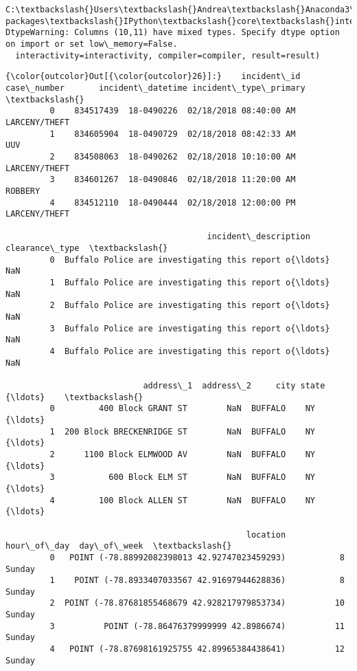 \documentclass[11pt]{article}
\begin{document}
    \begin{Verbatim}[commandchars=\\\{\}]
C:\textbackslash{}Users\textbackslash{}Andrea\textbackslash{}Anaconda3\textbackslash{}lib\textbackslash{}site-packages\textbackslash{}IPython\textbackslash{}core\textbackslash{}interactiveshell.py:2785: DtypeWarning: Columns (10,11) have mixed types. Specify dtype option on import or set low\_memory=False.
  interactivity=interactivity, compiler=compiler, result=result)

    \end{Verbatim}

\begin{Verbatim}[commandchars=\\\{\}]
{\color{outcolor}Out[{\color{outcolor}26}]:}    incident\_id case\_number       incident\_datetime incident\_type\_primary  \textbackslash{}
         0    834517439  18-0490226  02/18/2018 08:40:00 AM         LARCENY/THEFT   
         1    834605904  18-0490729  02/18/2018 08:42:33 AM                   UUV   
         2    834508063  18-0490262  02/18/2018 10:10:00 AM         LARCENY/THEFT   
         3    834601267  18-0490846  02/18/2018 11:20:00 AM               ROBBERY   
         4    834512110  18-0490444  02/18/2018 12:00:00 PM         LARCENY/THEFT   
         
                                         incident\_description  clearance\_type  \textbackslash{}
         0  Buffalo Police are investigating this report o{\ldots}             NaN   
         1  Buffalo Police are investigating this report o{\ldots}             NaN   
         2  Buffalo Police are investigating this report o{\ldots}             NaN   
         3  Buffalo Police are investigating this report o{\ldots}             NaN   
         4  Buffalo Police are investigating this report o{\ldots}             NaN   
         
                            address\_1  address\_2     city state   {\ldots}    \textbackslash{}
         0         400 Block GRANT ST        NaN  BUFFALO    NY   {\ldots}     
         1  200 Block BRECKENRIDGE ST        NaN  BUFFALO    NY   {\ldots}     
         2      1100 Block ELMWOOD AV        NaN  BUFFALO    NY   {\ldots}     
         3           600 Block ELM ST        NaN  BUFFALO    NY   {\ldots}     
         4         100 Block ALLEN ST        NaN  BUFFALO    NY   {\ldots}     
         
                                                 location hour\_of\_day  day\_of\_week  \textbackslash{}
         0   POINT (-78.88992082398013 42.92747023459293)           8       Sunday   
         1    POINT (-78.8933407033567 42.91697944628836)           8       Sunday   
         2  POINT (-78.87681855468679 42.928217979853734)          10       Sunday   
         3          POINT (-78.86476379999999 42.8986674)          11       Sunday   
         4   POINT (-78.87698161925755 42.89965384438641)          12       Sunday   
         

\end{Verbatim}
\end{document}
